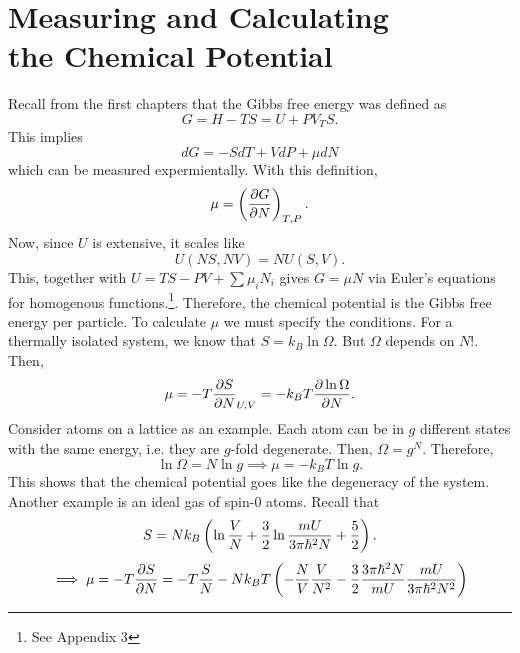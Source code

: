     \section{Measuring and Calculating \\ the Chemical Potential}
        Recall from the first chapters that the Gibbs free energy was defined as
        \begin{equation}
            G = H-TS = U+PV_TS.
        \end{equation}
        This implies
        \begin{equation}
            dG = -SdT + VdP + \mu dN
        \end{equation}
        which can be measured expermientally. With this definition,
        \begin{equation}
            \mu = \left( \frac{\partial G}{\partial N} \right)_{T,P}.
        \end{equation}
        Now, since $U$ is extensive, it scales like
        \begin{equation}
            U(NS,NV)=NU(S,V).
        \end{equation}
        This, together with $U=TS-PV+\sum\mu_i N_i$ gives $G=\mu N$ via Euler's equations for homogenous functions.\footnote{See Appendix 3}. Therefore, the chemical potential is the Gibbs free energy per particle. To calculate $\mu$ we must specify the conditions. For a thermally isolated system, we know that $S=k_B\ln\Omega$. But $\Omega$ depends on $N!$. Then,
        \begin{equation}
            \mu=-T \frac{\partial S}{\partial N}_{U,V}=-k_BT \frac{\partial \ln\Omega}{\partial N}.
        \end{equation}
        Consider atoms on a lattice as an example. Each atom can be in $g$ different states with the same energy, i.e. they are $g$-fold degenerate. Then, $\Omega = g^N$. Therefore,
        \begin{equation}
            \ln\Omega = N\ln g \implies \mu = -k_BT\ln g.
        \end{equation}
        This shows that the chemical potential goes like the degeneracy of the system. \\
        Another example is an ideal gas of spin-0 atoms. Recall that 
        \begin{equation}
            S = Nk_B\left( \ln\frac{V}{N}+\frac{3}{2}\ln\frac{mU}{3\pi\hbar^2 N}+\frac{5}{2} \right).
        \end{equation}
        \begin{equation}
            \implies \mu = -T\frac{\partial S}{\partial N}=-T\frac{S}{N}-Nk_BT\left( -\frac{N}{V}\frac{V}{N^2}-\frac{3}{2}\frac{3\pi\hbar^2N}{mU}\frac{mU}{3\pi\hbar^2 N^2} \right)
        \end{equation}
